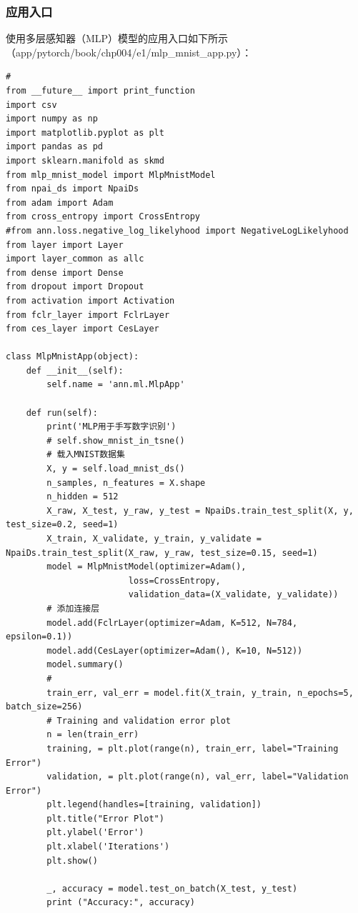 \documentclass[UTF8]{article}
\begin{document}
\subsubsection{应用入口}
使用多层感知器（MLP）模型的应用入口如下所示（app/pytorch/book/chp004/e1/mlp\_mnist\_app.py）：
\begin{lstlisting}
#
from __future__ import print_function
import csv
import numpy as np
import matplotlib.pyplot as plt
import pandas as pd
import sklearn.manifold as skmd
from mlp_mnist_model import MlpMnistModel
from npai_ds import NpaiDs
from adam import Adam
from cross_entropy import CrossEntropy
#from ann.loss.negative_log_likelyhood import NegativeLogLikelyhood
from layer import Layer
import layer_common as allc
from dense import Dense
from dropout import Dropout
from activation import Activation
from fclr_layer import FclrLayer
from ces_layer import CesLayer

class MlpMnistApp(object):
    def __init__(self):
        self.name = 'ann.ml.MlpApp'
        
    def run(self):
        print('MLP用于手写数字识别')
        # self.show_mnist_in_tsne()
        # 载入MNIST数据集
        X, y = self.load_mnist_ds()
        n_samples, n_features = X.shape
        n_hidden = 512
        X_raw, X_test, y_raw, y_test = NpaiDs.train_test_split(X, y, test_size=0.2, seed=1)
        X_train, X_validate, y_train, y_validate = NpaiDs.train_test_split(X_raw, y_raw, test_size=0.15, seed=1)
        model = MlpMnistModel(optimizer=Adam(),
                        loss=CrossEntropy,
                        validation_data=(X_validate, y_validate))
        # 添加连接层
        model.add(FclrLayer(optimizer=Adam, K=512, N=784, epsilon=0.1))
        model.add(CesLayer(optimizer=Adam(), K=10, N=512))
        model.summary()
        #
        train_err, val_err = model.fit(X_train, y_train, n_epochs=5, batch_size=256)
        # Training and validation error plot
        n = len(train_err)
        training, = plt.plot(range(n), train_err, label="Training Error")
        validation, = plt.plot(range(n), val_err, label="Validation Error")
        plt.legend(handles=[training, validation])
        plt.title("Error Plot")
        plt.ylabel('Error')
        plt.xlabel('Iterations')
        plt.show()

        _, accuracy = model.test_on_batch(X_test, y_test)
        print ("Accuracy:", accuracy)


\end{lstlisting}
\end{document}
